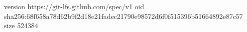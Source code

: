 version https://git-lfs.github.com/spec/v1
oid sha256:68f658a78d62b9f2d18e21fadec21790e98572d6f0f515396b51664892e87c57
size 524384
